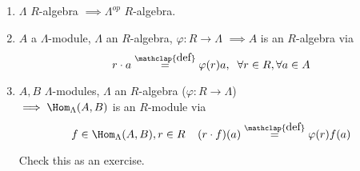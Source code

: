 \begin{note}
\begin{enumerate}
\item $\Lambda$ $R$-algebra $\implies \Lambda^{op}$ $R$-algebra.

\item $A$ a $\Lambda$-module, $\Lambda$ an $R$-algebra, $\varphi: R \to \Lambda$
$\implies A$ is an $R$-algebra via \[r\cdot a \stackrel{\mathclap{\normalfont\mbox{def}}}{=} \varphi(r)a, \;\; \forall r \in R, \forall a \in A\]


\item $A,B$ $\Lambda$-modules, $\Lambda$ an $R$-algebra ($\varphi:R\to\Lambda$)\\
$\implies  \Hom_\Lambda(A,B)$ is an $R$-module via \[f \in  \Hom_\Lambda(A,B), r \in R \;\;\;\; (r \cdot f)(a) \stackrel{\mathclap{\normalfont\mbox{def}}}{=} \varphi(r)f(a)\]

Check this as an exercise.
\end{enumerate}
\end{note}

